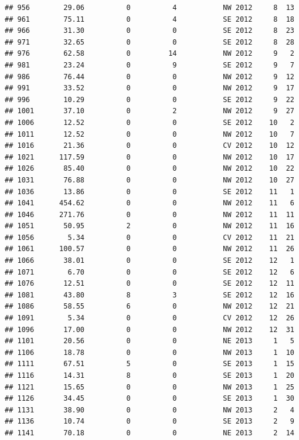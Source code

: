 \documentclass[
]{article}
\begin{document}
\begin{verbatim}
## 956        29.06          0          4           NW 2012     8  13
## 961        75.11          0          4           SE 2012     8  18
## 966        31.30          0          0           SE 2012     8  23
## 971        32.65          0          0           SE 2012     8  28
## 976        62.58          0         14           NW 2012     9   2
## 981        23.24          0          9           SE 2012     9   7
## 986        76.44          0          0           NW 2012     9  12
## 991        33.52          0          0           NW 2012     9  17
## 996        10.29          0          0           SE 2012     9  22
## 1001       37.10          0          2           NW 2012     9  27
## 1006       12.52          0          0           SE 2012    10   2
## 1011       12.52          0          0           NW 2012    10   7
## 1016       21.36          0          0           CV 2012    10  12
## 1021      117.59          0          0           NW 2012    10  17
## 1026       85.40          0          0           NW 2012    10  22
## 1031       76.88          0          0           NW 2012    10  27
## 1036       13.86          0          0           SE 2012    11   1
## 1041      454.62          0          0           NW 2012    11   6
## 1046      271.76          0          0           NW 2012    11  11
## 1051       50.95          2          0           NW 2012    11  16
## 1056        5.34          0          0           CV 2012    11  21
## 1061      100.57          0          0           NW 2012    11  26
## 1066       38.01          0          0           SE 2012    12   1
## 1071        6.70          0          0           SE 2012    12   6
## 1076       12.51          0          0           SE 2012    12  11
## 1081       43.80          8          3           SE 2012    12  16
## 1086       58.55          6          0           NW 2012    12  21
## 1091        5.34          0          0           CV 2012    12  26
## 1096       17.00          0          0           NW 2012    12  31
## 1101       20.56          0          0           NE 2013     1   5
## 1106       18.78          0          0           NW 2013     1  10
## 1111       67.51          5          0           SE 2013     1  15
## 1116       14.31          8          0           SE 2013     1  20
## 1121       15.65          0          0           NW 2013     1  25
## 1126       34.45          0          0           SE 2013     1  30
## 1131       38.90          0          0           NW 2013     2   4
## 1136       10.74          0          0           SE 2013     2   9
## 1141       70.18          0          0           NE 2013     2  14

\end{verbatim}
\end{document}
